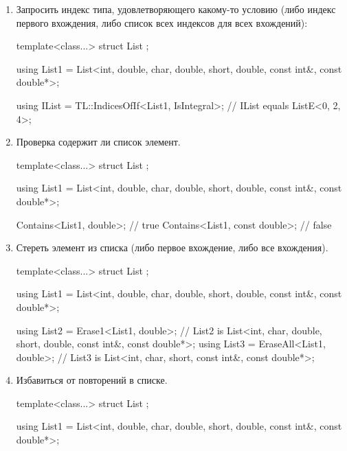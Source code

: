 \begin{enumerate}
\begin{cppcode}
IndexOf1<List1, double>; // equals 1
IndicesOf<List1, double>; // equals Seq<1, 3, 5>
\end{cppcode}
Во втором методе можно дополнительно сообщить тип контейнера, в который надо положить список элементов:
\begin{cppcode}
IndicesOf<List1, double, ListE>; // equals ListE<1, 3, 5>
\end{cppcode}

\item Запросить индекс типа, удовлетворяющего какому-то условию (либо индекс первого вхождения, либо список всех индексов для всех вхождений):
\begin{cppcode}
template<class...>
struct List {};

using List1 = List<int, double, char, double, short, double, const int&, const double*>;

using IList = TL::IndicesOfIf<List1, IsIntegral>;
// IList equals ListE<0, 2, 4>;
\end{cppcode}

\item Проверка содержит ли список элемент.
\begin{cppcode}
template<class...>
struct List {};

using List1 = List<int, double, char, double, short, double, const int&, const double*>;

Contains<List1, double>; // true
Contains<List1, const double>; // false
\end{cppcode}

\item Стереть элемент из списка (либо первое вхождение, либо все вхождения).
\begin{cppcode}
template<class...>
struct List {};

using List1 = List<int, double, char, double, short, double, const int&, const double*>;

using List2 = Erase1<List1, double>;
// List2 is List<int, char, double, short, double, const int&, const double*>;
using List3 = EraseAll<List1, double>;
// List3 is List<int, char, short, const int&, const double*>;
\end{cppcode}


\item Избавиться от повторений в списке.
\begin{cppcode}
template<class...>
struct List {};

using List1 = List<int, double, char, double, short, double, const int&, const double*>;


\end{cppcode}
\end{enumerate}
